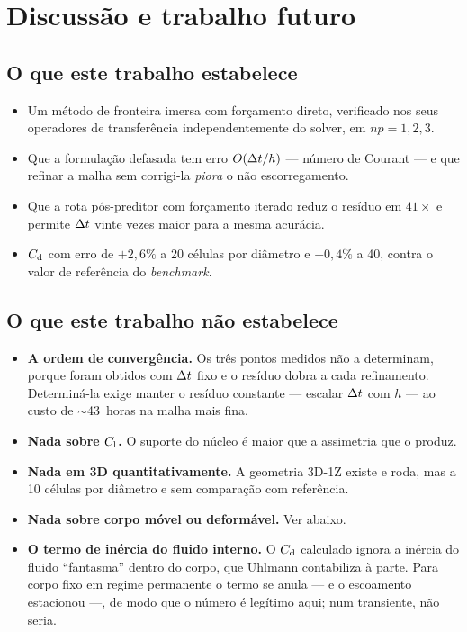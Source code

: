 \section{Discussão e trabalho futuro}
\label{sec:discussao}

\subsection{O que este trabalho estabelece}

\begin{itemize}
  \item Um método de fronteira imersa com forçamento direto, verificado nos seus
        operadores de transferência independentemente do solver, em $np=1,2,3$.
  \item Que a formulação defasada tem erro $O(\Delta t/h)$ --- número de Courant ---
        e que refinar a malha sem corrigi-la \emph{piora} o não escorregamento.
  \item Que a rota pós-preditor com forçamento iterado reduz o resíduo em
        $41\times$ e permite $\Delta t$ vinte vezes maior para a mesma acurácia.
  \item $C_{\mathrm{d}}$ com erro de $+2{,}6\%$ a 20 células por diâmetro e $+0{,}4\%$ a 40,
        contra o valor de referência do \emph{benchmark}.
\end{itemize}

\subsection{O que este trabalho não estabelece}

\begin{itemize}
  \item \textbf{A ordem de convergência.} Os três pontos medidos não a
        determinam, porque foram obtidos com $\Delta t$ fixo e o resíduo dobra a cada
        refinamento. Determiná-la exige manter o resíduo constante --- escalar
        $\Delta t$ com $h$ --- ao custo de $\sim$43~horas na malha mais fina.
  \item \textbf{Nada sobre $C_{\mathrm{l}}$.} O suporte do núcleo é maior que a assimetria
        que o produz.
  \item \textbf{Nada em 3D quantitativamente.} A geometria 3D-1Z existe e roda,
        mas a 10 células por diâmetro e sem comparação com referência.
  \item \textbf{Nada sobre corpo móvel ou deformável.} Ver abaixo.
  \item \textbf{O termo de inércia do fluido interno.} O $C_{\mathrm{d}}$ calculado ignora a
        inércia do fluido ``fantasma'' dentro do corpo, que Uhlmann contabiliza à
        parte. Para corpo fixo em regime permanente o termo se anula --- e o
        escoamento estacionou ---, de modo que o número é legítimo aqui; num
        transiente, não seria.
\end{itemize}

